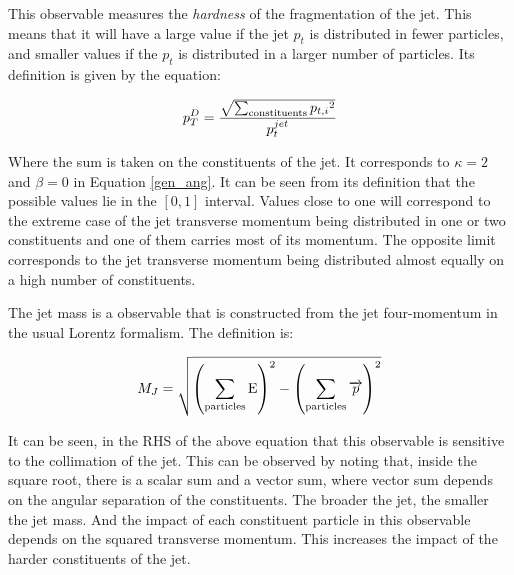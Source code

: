 This observable measures the \emph{hardness} of the fragmentation of the jet. This means that it will have a large value if the jet $p_t$ is distributed in fewer particles, and smaller values if the $p_t$ is distributed in a larger number of particles. Its definition is given by the equation:

\begin{equation}
p_T^D = \frac{\sqrt{ \sum_{\rm constituents} {p_{t,i}}^2 }}{p_t^{jet}}
\end{equation}

Where the sum is taken on the constituents of the jet. It corresponds to $\kappa=2$ and $\beta=0$ in Equation \eqref{gen_ang}. It can be seen from its definition that the possible values lie in the $\left[0 , 1 \right]$ interval. Values close to one will correspond to the extreme case of the jet transverse momentum being distributed in one or two constituents and one of them carries most of its momentum. The opposite limit corresponds to the jet transverse momentum being distributed almost equally on a high number of constituents.


The jet mass is a observable that is constructed from the jet four-momentum in the usual Lorentz formalism. The definition is:

\begin{equation}
M_J = \sqrt{ \left( \sum_{\rm particles} {\rm E} \right)^2 - \left( \sum_{\rm particles} {\rm \overrightarrow{p}} \right)^2 }
\end{equation}

It can be seen, in the RHS of the above equation that this observable is sensitive to the collimation of the jet. This can be observed by noting that, inside the square root, there is a scalar sum and a vector sum, where vector sum depends on the angular separation of the constituents. The broader the jet, the smaller the jet mass. And the impact of each constituent particle in this observable depends on the squared transverse momentum. This increases the impact of the harder constituents of the jet.




